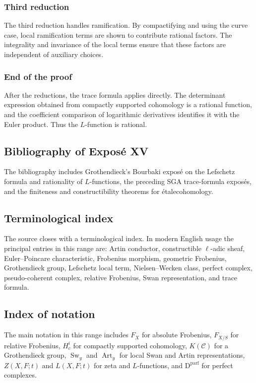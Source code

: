 \documentclass[14pt]{extarticle}
\newcommand{\Sw}{\operatorname{Sw}}
\newcommand{\Art}{\operatorname{Art}}
\newcommand{\D}{\mathrm D}
\newcommand{\cC}{\mathcal C}
\providecommand{\etale}{\'{e}tale}
\begin{document}
\subsubsection*{Third reduction}

The third reduction handles ramification. By compactifying and using the curve case, local ramification terms are shown to contribute rational factors. The integrality and invariance of the local terms ensure that these factors are independent of auxiliary choices.

\subsubsection*{End of the proof}

After the reductions, the trace formula applies directly. The determinant expression obtained from compactly supported cohomology is a rational function, and the coefficient comparison of logarithmic derivatives identifies it with the Euler product. Thus the $L$-function is rational.

\subsection*{Bibliography of Expos\'e XV}

The bibliography includes Grothendieck's Bourbaki expos\'e on the Lefschetz formula and rationality of $L$-functions, the preceding SGA trace-formula expos\'es, and the finiteness and constructibility theorems for \etale cohomology.

\subsection*{Terminological index}

The source closes with a terminological index. In modern English usage the principal entries in this range are: Artin conductor, constructible $\ell$-adic sheaf, Euler--Poincare characteristic, Frobenius morphism, geometric Frobenius, Grothendieck group, Lefschetz local term, Nielsen--Wecken class, perfect complex, pseudo-coherent complex, relative Frobenius, Swan representation, and trace formula.

\subsection*{Index of notation}

The main notation in this range includes $F_X$ for absolute Frobenius, $F_{X/S}$ for relative Frobenius, $H^i_c$ for compactly supported cohomology, $K(\cC)$ for a Grothendieck group, $\Sw_y$ and $\Art_y$ for local Swan and Artin representations, $Z(X,F;t)$ and $L(X,F;t)$ for zeta and $L$-functions, and $\D^{\mathrm{parf}}$ for perfect complexes.
\end{document}
